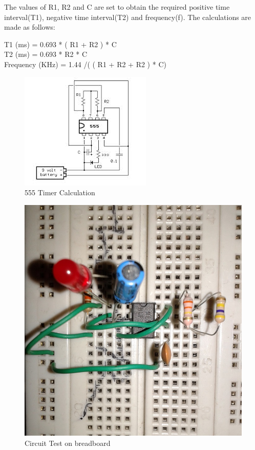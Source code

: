 \documentclass[12pt, a4paper]{article}
\begin{document}
	The values of R1, R2 and C are set to obtain the required positive time interval(T1), negative time interval(T2) and frequency(f). The calculations are made as follows:

	\noindent
	T1 (ms) = 0.693 * ( R1 + R2 ) * C \\
	T2 (ms)  = 0.693 * R2 * C \\
	Frequency (KHz)  = 1.44 /( ( R1 + R2 + R2 ) * C)

\begin{figure}[htp]
	\centering
	\includegraphics[scale=1]{blinking.jpg}
	\caption{555 Timer Calculation}
	\label{}
\end{figure}

\begin{figure}[htp]
	\centering
	\includegraphics[scale=0.4]{circuit.jpg}
	\caption{Circuit Test on breadboard}
	\label{}
\end{figure}
\end{document}
